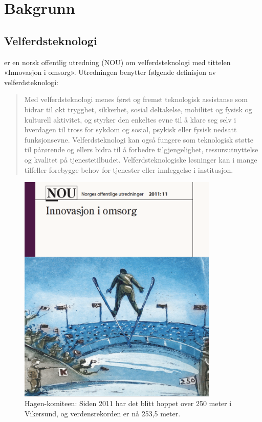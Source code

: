 \chapter{Bakgrunn}
\label{ch:background}

\section{Velferdsteknologi}
\citet{regjeringen_hagen} er en norsk offentlig utredning (NOU) om velferdsteknologi med tittelen «Innovasjon i omsorg».
Utredningen benytter følgende definisjon av velferdsteknologi:

\blockquote{
Med velferdsteknologi menes først og fremst
teknologisk assistanse som bidrar til økt trygghet,
sikkerhet, sosial deltakelse, mobilitet og
fysisk og kulturell aktivitet, og styrker den
enkeltes evne til å klare seg selv i hverdagen til
tross for sykdom og sosial, psykisk eller fysisk
nedsatt funksjonsevne. Velferdsteknologi kan
også fungere som teknologisk støtte til pårørende og
ellers bidra til å forbedre tilgjengelighet,
ressursutnyttelse og kvalitet på tjenestetilbudet.
Velferdsteknologiske løsninger kan i
mange tilfeller forebygge behov for tjenester
eller innleggelse i institusjon.
}

\begin{figure}
\includegraphics[width=0.85\textwidth,center]{fig/hagen}
\caption{Hagen-komiteen: Siden 2011 har det blitt hoppet over 250 meter i Vikersund, og verdensrekorden er nå 253,5 meter. }
\label{fig:hagen}
\end{figure}

